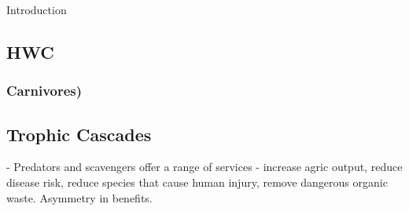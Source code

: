 Introduction

\subsection{HWC}

\subsubsectionHerbivores

\subsubsection{Carnivores)}

\subsection{Trophic Cascades}

\cite{O_Bryan_2018} - Predators and scavengers offer a range of services - increase agric output, reduce disease risk, reduce species that cause human injury, remove dangerous organic waste. Asymmetry in benefits.


